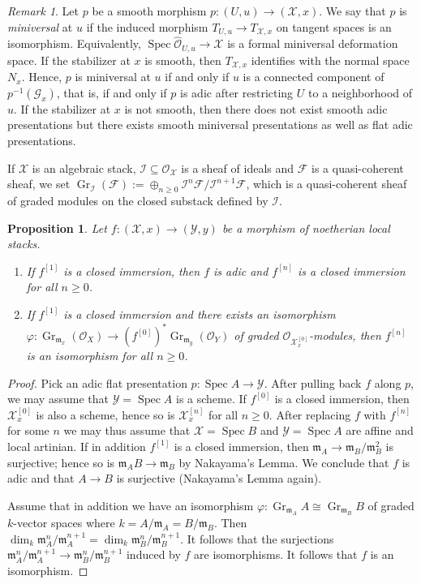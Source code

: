 \documentclass[a4paper]{amsart}
\theoremstyle{plain}
\newtheorem{proposition}[theorem]{Proposition}
\theoremstyle{definition}
\theoremstyle{remark}
\newtheorem{remark}[theorem]{Remark}
\numberwithin{equation}{section}
\newcommand{\stX}{\mathcal{X}} %
\newcommand{\stY}{\mathcal{Y}} %
\newcommand{\idm}{\mathfrak{m}} %
\DeclareMathOperator{\Gr}{Gr} %
\newcommand\cF{\mathcal{F}}
\newcommand\cG{\mathcal{G}}
\newcommand\cI{\mathcal{I}}
\newcommand\cX{\mathcal{X}}
\newcommand\oh{\mathcal{O}}
\DeclareMathOperator{\Spec}{Spec}
\renewcommand{\hat}{\widehat}
\begin{document}
\begin{remark}\label{R:miniversal}
Let $p$ be a smooth morphism $p\colon (U,u)\to (\stX,x)$. We say that $p$ is
\emph{miniversal} at $u$ if the induced morphism $T_{U,u}\to T_{\stX,x}$ on
tangent spaces is an isomorphism. Equivalently, $\Spec \hat{\oh}_{U,u}\to
\stX$ is a formal miniversal deformation space.
%
If the stabilizer at $x$ is smooth, then
$T_{\stX,x}$ identifies with the normal space $N_x$. Hence, $p$ is miniversal at $u$
if and only if $u$ is a connected component of $p^{-1}(\cG_x)$, that is, if and
only if $p$ is adic after restricting $U$ to a neighborhood of $u$. If the stabilizer at $x$ is
not smooth, then there does not exist smooth adic presentations but there
exists smooth miniversal presentations as well as flat adic presentations.
\end{remark}

If $\cX$ is an algebraic stack, $\cI \subseteq \oh_{\cX}$ is a sheaf of ideals and $\cF$ is a quasi-coherent sheaf, we set $\Gr_{\cI}(\cF) := \oplus_{n \ge 0} \cI^n \cF / \cI^{n+1} \cF$, which is a quasi-coherent sheaf of graded modules on the
closed substack defined by $\cI$.

\begin{proposition}\label{P:closed/iso-cond:infinitesimal}
Let $f\colon (\stX,x)\to (\stY,y)$ be a morphism of noetherian local stacks.
\begin{enumerate}
\item\label{PI:closed:infinitesimal}
  If $f^{[1]}$ is a closed immersion, then $f$ is adic and $f^{[n]}$ is
  a closed immersion for all $n\geq 0$.
\item\label{PI:iso:infinitesimal}
  If $f^{[1]}$ is a closed immersion and there
  exists an isomorphism $\varphi\colon \Gr_{\idm_x}(\oh_X)\to
  (f^{[0]})^*\Gr_{\idm_y}(\oh_Y)$ of graded $\oh_{\stX_x^{[0]}}$-modules,
  then $f^{[n]}$ is an isomorphism for all $n\geq 0$.
\end{enumerate}
\end{proposition}
\begin{proof}
Pick an adic flat
presentation $p\colon \Spec A\to \stY$. After pulling back $f$ along $p$, we
may assume that $\stY=\Spec A$ is a scheme. If $f^{[0]}$ is a closed immersion,
then $\stX_x^{[0]}$ is also a scheme, hence so is $\stX_x^{[n]}$ for all $n\geq 0$.
After replacing $f$ with $f^{[n]}$ for some $n$ we may thus assume that
$\stX=\Spec B$ and $\stY=\Spec A$ are affine and local artinian.
If
in addition $f^{[1]}$ is a closed immersion, then $\idm_A\to
\idm_B/\idm_B^2$ is surjective; hence so is $\idm_AB\to \idm_B$ by Nakayama's
Lemma. We conclude that $f$ is adic and that $A\to B$ is surjective (Nakayama's
Lemma again).

Assume that in addition we have an isomorphism $\varphi\colon
\Gr_{\idm_A}A\cong \Gr_{\idm_B} B$ of graded $k$-vector spaces where
$k=A/\idm_A=B/\idm_B$. Then $\dim_k \idm_A^n/\idm_A^{n+1}=\dim_k
\idm_B^n/\idm_B^{n+1}$. It follows that the surjections
$\idm_A^n/\idm_A^{n+1}\to \idm_B^n/\idm_B^{n+1}$ induced by $f$ are
isomorphisms. It follows that $f$ is an isomorphism.
\end{proof}
\end{document}
